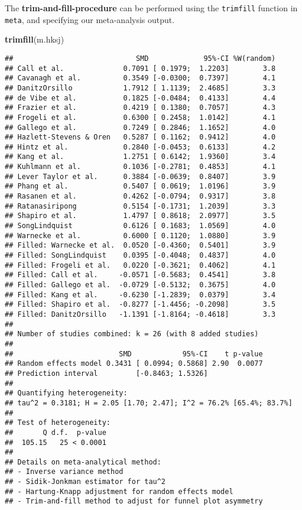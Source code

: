 \documentclass[]{book}
\newenvironment{Shaded}{\begin{snugshade}}{\end{snugshade}}
\newcommand{\KeywordTok}[1]{\textcolor[rgb]{0.13,0.29,0.53}{\textbf{#1}}}
\newcommand{\NormalTok}[1]{#1}
\theoremstyle{definition}
\theoremstyle{definition}
\theoremstyle{definition}
\theoremstyle{remark}
\begin{document}
The \textbf{trim-and-fill-procedure} can be performed using the
\texttt{trimfill} function in \texttt{meta}, and specifying our
meta-analysis output.

\begin{Shaded}
\begin{Highlighting}[]
\KeywordTok{trimfill}\NormalTok{(m.hksj)}
\end{Highlighting}
\end{Shaded}

\begin{verbatim}
##                             SMD             95%-CI %W(random)
## Call et al.              0.7091 [ 0.1979;  1.2203]        3.8
## Cavanagh et al.          0.3549 [-0.0300;  0.7397]        4.1
## DanitzOrsillo            1.7912 [ 1.1139;  2.4685]        3.3
## de Vibe et al.           0.1825 [-0.0484;  0.4133]        4.4
## Frazier et al.           0.4219 [ 0.1380;  0.7057]        4.3
## Frogeli et al.           0.6300 [ 0.2458;  1.0142]        4.1
## Gallego et al.           0.7249 [ 0.2846;  1.1652]        4.0
## Hazlett-Stevens & Oren   0.5287 [ 0.1162;  0.9412]        4.0
## Hintz et al.             0.2840 [-0.0453;  0.6133]        4.2
## Kang et al.              1.2751 [ 0.6142;  1.9360]        3.4
## Kuhlmann et al.          0.1036 [-0.2781;  0.4853]        4.1
## Lever Taylor et al.      0.3884 [-0.0639;  0.8407]        3.9
## Phang et al.             0.5407 [ 0.0619;  1.0196]        3.9
## Rasanen et al.           0.4262 [-0.0794;  0.9317]        3.8
## Ratanasiripong           0.5154 [-0.1731;  1.2039]        3.3
## Shapiro et al.           1.4797 [ 0.8618;  2.0977]        3.5
## SongLindquist            0.6126 [ 0.1683;  1.0569]        4.0
## Warnecke et al.          0.6000 [ 0.1120;  1.0880]        3.9
## Filled: Warnecke et al.  0.0520 [-0.4360;  0.5401]        3.9
## Filled: SongLindquist    0.0395 [-0.4048;  0.4837]        4.0
## Filled: Frogeli et al.   0.0220 [-0.3621;  0.4062]        4.1
## Filled: Call et al.     -0.0571 [-0.5683;  0.4541]        3.8
## Filled: Gallego et al.  -0.0729 [-0.5132;  0.3675]        4.0
## Filled: Kang et al.     -0.6230 [-1.2839;  0.0379]        3.4
## Filled: Shapiro et al.  -0.8277 [-1.4456; -0.2098]        3.5
## Filled: DanitzOrsillo   -1.1391 [-1.8164; -0.4618]        3.3
## 
## Number of studies combined: k = 26 (with 8 added studies)
## 
##                         SMD            95%-CI    t p-value
## Random effects model 0.3431 [ 0.0994; 0.5868] 2.90  0.0077
## Prediction interval         [-0.8463; 1.5326]             
## 
## Quantifying heterogeneity:
## tau^2 = 0.3181; H = 2.05 [1.70; 2.47]; I^2 = 76.2% [65.4%; 83.7%]
## 
## Test of heterogeneity:
##       Q d.f.  p-value
##  105.15   25 < 0.0001
## 
## Details on meta-analytical method:
## - Inverse variance method
## - Sidik-Jonkman estimator for tau^2
## - Hartung-Knapp adjustment for random effects model
## - Trim-and-fill method to adjust for funnel plot asymmetry
\end{verbatim}
\end{document}

